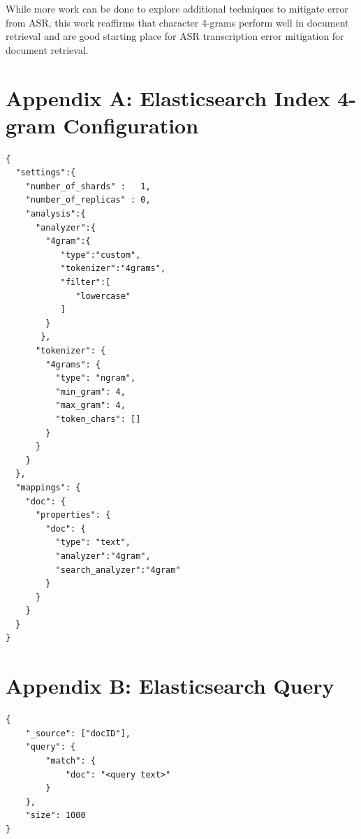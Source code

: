 \documentclass[jair, twoside,11pt,theapa]{article}
\begin{document}
While more work can be done to explore additional techniques to mitigate error from ASR, this work reaffirms that character 4-grams perform well in document retrieval and are good starting place for ASR transcription error mitigation for document retrieval. 



\vskip 0.2in



\raggedbottom
\pagebreak 

\section*{Appendix A: Elasticsearch Index 4-gram Configuration}
\begin{verbatim}
{
  "settings":{
    "number_of_shards" :   1,
    "number_of_replicas" : 0,
    "analysis":{
      "analyzer":{
        "4gram":{ 
           "type":"custom",
           "tokenizer":"4grams",
           "filter":[
              "lowercase"
           ]
        }
       },
      "tokenizer": {
        "4grams": {
          "type": "ngram",
          "min_gram": 4,
          "max_gram": 4,
          "token_chars": []
        }
      }
    }
  },
  "mappings": {
    "doc": {
      "properties": {
        "doc": { 
          "type": "text",
          "analyzer":"4gram",
          "search_analyzer":"4gram"
        }
      }
    }
  }
}
\end{verbatim}

\pagebreak

\section*{Appendix B: Elasticsearch Query}
\label{Appendix B}
\begin{verbatim}
{
    "_source": ["docID"],
    "query": {
        "match": {
            "doc": "<query text>"
        }
    },
    "size": 1000
}
\end{verbatim}

\pagebreak
\end{document}
